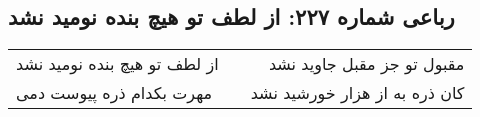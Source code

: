 \begin{center}
\section*{رباعی شماره ۲۲۷: از لطف تو هیچ بنده نومید نشد}
\label{sec:sh227}
\begin{longtable}{l p{0.5cm} r}
از لطف تو هیچ بنده نومید نشد
&&
مقبول تو جز مقبل جاوید نشد
\\
مهرت بکدام ذره پیوست دمی
&&
کان ذره به از هزار خورشید نشد
\\
\end{longtable}
\end{center}
